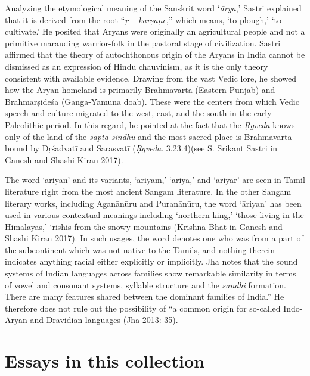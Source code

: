 Analyzing the etymological meaning of the Sanskrit word ‘\textit{ārya},’ Sastri explained that it is derived from the root “\textit{ṝ – karṣaṇe},” which means, ‘to plough,’ ‘to cultivate.’ He posited that Aryans were originally an agricultural people and not a primitive marauding warrior-folk in the pastoral stage of civilization. Sastri affirmed that the theory of autochthonous origin of the Aryans in India cannot be dismissed as an expression of Hindu chauvinism, as it is the only theory consistent with available evidence. Drawing from the vast Vedic lore, he showed how the Aryan homeland is primarily Brahmāvarta (Eastern Punjab) and Brahmarṣideśa (Ganga-Yamuna doab). These were the centers from which Vedic speech and culture migrated to the west, east, and the south in the early Paleolithic period. In this regard, he pointed at the fact that the \textit{Ṛgveda} knows only of the land of the \textit{sapta-sindhu} and the most sacred place is Brahmāvarta bound by Dṛśadvatī and Sarasvatī (\textit{Ŗgveda}. 3.23.4)(see S. Srikant Sastri in Ganesh and Shashi Kiran 2017).

The word ‘āriyan’ and its variants, ‘āriyam,’ ‘āriya,’ and ‘āriyar’ are seen in Tamil literature right from the most ancient Sangam literature. In the other Sangam literary works, including Aganānūru and Puranānūru, the word ‘āriyan’ has been used in various contextual meanings including ‘northern king,’ ‘those living in the Himalayas,’ ‘rishis from the snowy mountains (Krishna Bhat in Ganesh and Shashi Kiran 2017). In such usages, the word denotes one who was from a part of the subcontinent which was not native to the Tamils, and nothing therein indicates anything racial either explicitly or implicitly. Jha notes that the sound systems of Indian languages across families show remarkable similarity in terms of vowel and consonant systems, syllable structure and the \textit{sandhi} formation. There are many features shared between the dominant families of India.” He therefore does not rule out the possibility of “a common origin for so-called Indo-Aryan and Dravidian languages (Jha 2013: 35).


\section*{Essays in this collection}

